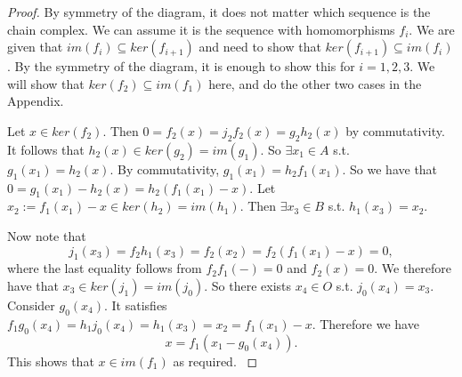 \begin{proof}
By symmetry of the diagram, it does not matter which sequence is the chain complex. We can assume it is the sequence with homomorphisms $f_i$. We are given that $im(f_i)\subseteq ker(f_{i+1})$ and need to show that $ker(f_{i+1})\subseteq im(f_i)$. By the symmetry of the diagram, it is enough to show this for $i=1,2,3$. We will show that $ker(f_2)\subseteq im(f_1)$ here, and do the other two cases in the Appendix.

Let $x\in ker(f_2)$. Then $0=f_2(x)=j_2f_2(x)=g_2h_2(x)$ by commutativity. It follows that $h_2(x)\in ker(g_2)=im(g_1)$. So $\exists x_1\in A$ s.t. $g_1 (x_1)=h_2(x)$. By commutativity, $g_1(x_1)=h_2f_1 (x_1)$. So we have that $0=g_1 (x_1)-h_2(x)=h_2(f_1 (x_1)-x)$. Let $x_2:=f_1(x_1)-x\in ker(h_2)=im(h_1)$. Then $\exists x_3\in B$ s.t. $h_1(x_3)=x_2$.

Now note that $$j_1(x_3)=f_2h_1(x_3)=f_2(x_2)=f_2(f_1(x_1)-x)=0,$$
where the last equality follows from $f_2f_1(-)=0$ and $f_2(x)=0$. We therefore have that $x_3\in ker(j_1)=im(j_0)$. So there exists $x_4\in O$ s.t. $j_0(x_4)=x_3$. Consider $g_0(x_4).$ It satisfies $f_1g_0(x_4)=h_1j_0(x_4)=h_1(x_3)=x_2=f_1(x_1)-x$. Therefore we have
$$x=f_1(x_1-g_0(x_4)).$$
This shows that $x\in im(f_1)$ as required.
\cite{Eilenberg}
\end{proof}